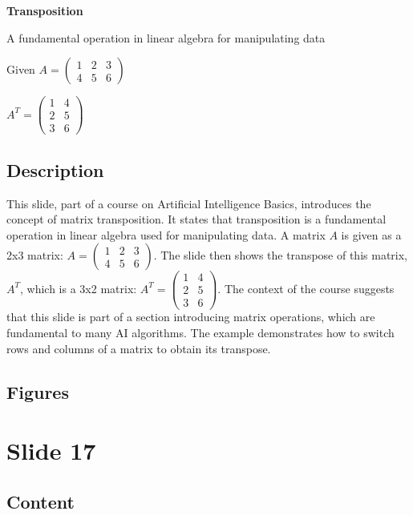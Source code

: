 \documentclass{article}%
\begin{document}
\textbf{Transposition}

A fundamental operation in linear algebra for manipulating data

Given $A = \begin{pmatrix} 1 & 2 & 3 \\ 4 & 5 & 6 \end{pmatrix}$

$A^T = \begin{pmatrix} 1 & 4 \\ 2 & 5 \\ 3 & 6 \end{pmatrix}$
%
\subsection{Description}%
This slide, part of a course on Artificial Intelligence Basics, introduces the concept of matrix transposition.  It states that transposition is a fundamental operation in linear algebra used for manipulating data.  A matrix $A$ is given as a 2x3 matrix: $A = \begin{pmatrix} 1 & 2 & 3 \\ 4 & 5 & 6 \end{pmatrix}$.  The slide then shows the transpose of this matrix, $A^T$, which is a 3x2 matrix: $A^T = \begin{pmatrix} 1 & 4 \\ 2 & 5 \\ 3 & 6 \end{pmatrix}$.  The context of the course suggests that this slide is part of a section introducing matrix operations, which are fundamental to many AI algorithms.  The example demonstrates how to switch rows and columns of a matrix to obtain its transpose.%
\subsection{Figures}%
\begin{figure}[H]%
\centering%
\end{figure}

%
\newpage%
\section{Slide 17}%
\label{sec:Slide17}%
\subsection{Content}%
%
\end{document}
